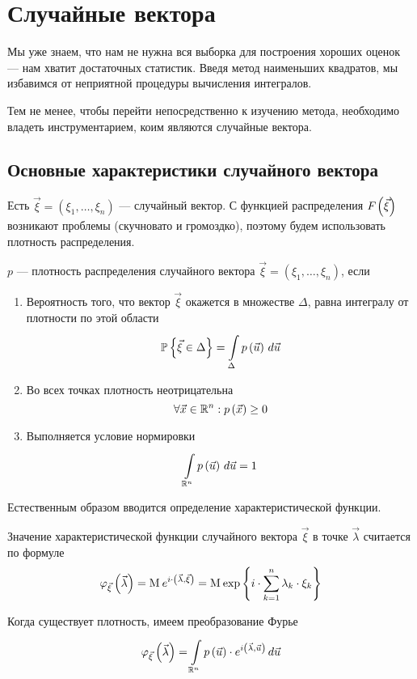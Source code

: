 \chapter{Случайные вектора}

Мы уже знаем, что нам не нужна вся выборка для построения хороших оценок ---
нам хватит достаточных статистик. Введя метод наименьших квадратов,
мы избавимся от неприятной процедуры вычисления интегралов.

Тем не менее, чтобы перейти непосредственно к изучению метода, необходимо
владеть инструментарием, коим являются случайные вектора.

\section{Основные характеристики случайного вектора}

Есть $\vec{\xi} = \left( \xi_1, \dots, \xi_n \right)$ --- случайный вектор.
С функцией распределения $\cdf{\vec{\xi}}$ возникают проблемы (скучновато и
громоздко), поэтому будем использовать плотность распределения.

\begin{definition}
    $p$ --- плотность распределения случайного вектора
    $\vec{\xi} = \left( \xi_1, \dots, \xi_n \right)$, если
    \begin{enumerate}
        \item Вероятность того, что вектор $\vec{\xi}$ окажется
            в множестве $\Delta$, равна интегралу от плотности по этой области
            $$\Probability{\vec{\xi} \in \Delta}
                = \integrall{\Delta}{d\vec{u}}{\pdf{\vec{u}}}$$
        \item Во всех точках плотность неотрицательна
            $$\forall \vec{x} \in \mathbb{R}^n: \pdf{\vec{x}} \ge 0$$
        \item Выполняется условие нормировки
            $$\integrall{\mathbb{R}^n}{d\vec{u}}{\pdf{\vec{u}}} = 1$$
    \end{enumerate}
\end{definition}

Естественным образом вводится определение характеристической функции.

\begin{definition}
    Значение характеристической функции случайного вектора $\vec{\xi}$
    в точке $\vec{\lambda}$ считается по формуле
    $$\varphi_{\vec{\xi}}\left( \vec{\lambda} \right)
        = \mean{e^{i \cdot \left( \vec{\lambda}, \vec{\xi} \right)}}
        = \mean{
            \exp{\left\{ i \cdot \sum_{k=1}^n \lambda_k \cdot \xi_k \right\}}}$$

    Когда существует плотность, имеем преобразование Фурье
    $$\varphi_{\vec{\xi}}\left( \vec{\lambda} \right)
        = \integrall{\mathbb{R}^n}{d\vec{u}}{\pdf{\vec{u}} \cdot
            e^{i \left( \vec{\lambda}, \vec{u} \right)}}$$
\end{definition}

